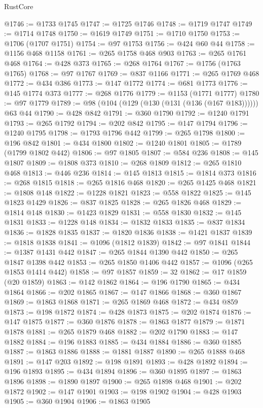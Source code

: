 \begin{lexlean}{RustCore}
\begin{coremodule}
@1746 := @1733 @1745
@1747 := @1725 @1746
@1748 := @1719 @1747
@1749 := @1714 @1748
@1750 := @1619 @1749
@1751 := @1710 @1750
@1753 := @1706 (@1707 @1751)
@1754 := @97 @1753
@1756 := @424 @60 @44
@1758 := @1156 @468 @1158
@1761 := @265 @1758 @468 @903
@1763 := @265 @1761 @468
@1764 := @428 @373
@1765 := @268 @1764
@1767 := @1756 (@1763 @1765)
@1768 := @97 @1767
@1769 := @837 @1166
@1771 := @265 @1769 @468
@1772 := @434 @386
@1773 := @147 @1772
@1774 := @681 @1773
@1776 := @145 @1774 @373
@1777 := @268 @1776
@1779 := @1153 (@1771 @1777)
@1780 := @97 @1779
@1789 := @98 (@104 (@129 (@130 (@131 (@136 (@167 @183)))))) @63 @44
@1790 := @428 @842
@1791 := @360 @1790
@1792 := @1240 @1791
@1793 := @265 @1792
@1794 := @202 @842
@1795 := @147 @1794
@1796 := @1240 @1795
@1798 := @1793 @1796 @442
@1799 := @265 @1798
@1800 := @196 @842
@1801 := @434 @1800
@1802 := @1240 @1801
@1805 := @1789 (@1799 @1802 @442)
@1806 := @97 @1805
@1807 := @584 @236
@1808 := @145 @1807
@1809 := @1808 @373
@1810 := @268 @1809
@1812 := @265 @1810 @468
@1813 := @446 @236
@1814 := @145 @1813
@1815 := @1814 @373
@1816 := @268 @1815
@1818 := @265 @1816 @468
@1820 := @265 @1425 @468
@1821 := @1808 @148
@1822 := @1228 @1821
@1823 := @558 @1822
@1825 := @145 @1823 @1429
@1826 := @837 @1825
@1828 := @265 @1826 @468
@1829 := @1814 @148
@1830 := @1423 @1829
@1831 := @558 @1830
@1832 := @145 @1831
@1833 := @1228 @148
@1834 := @1832 @1833
@1835 := @837 @1834
@1836 := @1828 @1835
@1837 := @1820 @1836
@1838 := @1421 @1837
@1839 := @1818 @1838
@1841 := @1096 (@1812 @1839)
@1842 := @97 @1841
@1844 := @1387 @1431 @442
@1847 := @265 @1844 @1390 @442
@1850 := @265 @1847 @1398 @442
@1853 := @265 @1850 @1406 @442
@1857 := @1096 (@265 @1853 @1414 @442)
@1858 := @97 @1857
@1859 := 32
@1862 := @17 @1859 (@20 @1859)
@1863 := @142 @1862
@1864 := @196 @1790
@1865 := @434 @1864
@1866 := @202 @1865
@1867 := @147 @1866
@1868 := @360 @1867
@1869 := @1863 @1868
@1871 := @265 @1869 @468
@1872 := @434 @859
@1873 := @198 @1872
@1874 := @428 @1873
@1875 := @202 @1874
@1876 := @147 @1875
@1877 := @360 @1876
@1878 := @1863 @1877
@1879 := @1871 @1878
@1881 := @265 @1879 @468
@1882 := @202 @1790
@1883 := @147 @1882
@1884 := @196 @1883
@1885 := @434 @1884
@1886 := @360 @1885
@1887 := @1863 @1886
@1888 := @1881 @1887
@1890 := @265 @1888 @468
@1891 := @147 @203
@1892 := @198 @1891
@1893 := @428 @1892
@1894 := @196 @1893
@1895 := @434 @1894
@1896 := @360 @1895
@1897 := @1863 @1896
@1898 := @1890 @1897
@1900 := @265 @1898 @468
@1901 := @202 @1872
@1902 := @147 @1901
@1903 := @198 @1902
@1904 := @428 @1903
@1905 := @360 @1904
@1906 := @1863 @1905

\end{coremodule}
\end{lexlean}
